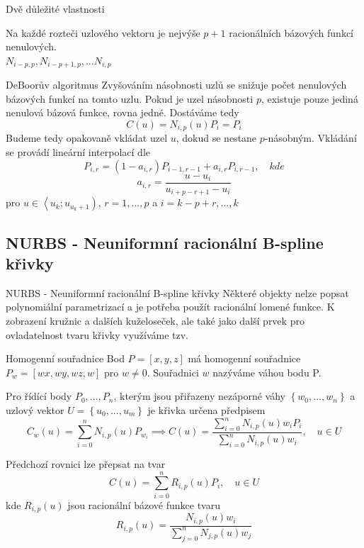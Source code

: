 \documentclass[hyperref={unicode}]{beamer}
\begin{document}
\begin{frame}{Dvě důležité vlastnosti}
\begin{minipage}{0.4\textwidth}
\end{minipage}
\begin{minipage}{0.55\textwidth}\raggedright
Na každé rozteči uzlového vektoru je nejvýše $p+1$ racionálních bázových funkcí nenulových.\\
$N_{i-p,p},N_{i-p+1,p},...N_{i,p}$
\end{minipage}
\end{frame}

\begin{frame}{DeBoorův algoritmus}
Zvyšováním násobnosti uzlů se snižuje počet nenulových bázových funkcí na tomto uzlu. Pokud je uzel násobnosti $p$, existuje pouze jediná nenulová bázová funkce, rovna jedné. Dostáváme tedy
$$C\left(u\right)=N_{i,p}\left(u\right)P_i=P_i$$
Budeme tedy opakovaně vkládat uzel $u$, dokud se nestane $p$-násobným. Vkládání se provádí lineární interpolací dle
$$P_{i,r}=\left(1-a_{i,r}\right)P_{i-1,r-1}+a_{i,r}P_{i,r-1},\quad kde$$
$$a_{i,r}=\frac{u-u_i}{u_{i+p-r+1}-u_i}$$
pro $u\in \left\langle u_k;u_{u_k+1}\right)$, $r=1,...,p$ a $i=k-p+r,...,k$
\end{frame}

\subsection{NURBS - Neuniformní racionální B-spline křivky}
\begin{frame}{NURBS - Neuniformní racionální B-spline křivky}
Některé objekty nelze popsat polynomiální parametrizací a je potřeba použít racionální lomené funkce. K zobrazení kružnic a dalších kuželoseček, ale také jako další prvek pro ovladatelnost tvaru křivky využíváme tzv.
\begin{block}{Homogenní souřadnice}
Bod $P=\left[x,y,z\right]$ má homogenní souřadnice $P_w=\left[wx,wy,wz,w\right]$ pro $w\neq0$. Souřadnici $w$ nazýváme váhou bodu P.
\end{block}
Pro řídící body $P_0,...,P_n$, kterým jsou přiřazeny nezáporné váhy $\left\lbrace w_0,...,w_n \right\rbrace$ a uzlový vektor $U=\left\lbrace u_0,...,u_m \right\rbrace$ je křivka určena předpisem
$$C_w\left(u\right)=\sum _{i=0}^{n}{N}_{i,p}\left(u\right){P}_{w_i} \implies C\left(u\right)=\frac{\sum _{i=0}^{n}{N}_{i,p}\left(u\right)w_i{P}_{i}}{\sum _{i=0}^{n}{N}_{i,p}\left(u\right)w_i},\quad u\in U$$
\end{frame}

\begin{frame}
Předchozí rovnici lze přepsat na tvar
$$C\left(u\right)=\sum _{i=0}^{n}{R}_{i,p}\left(u\right){P}_{i},\quad u\in U$$
kde ${R}_{i,p}\left( u \right)$ jsou racionální bázové funkce tvaru
$${R}_{i,p}\left(u\right)=\frac{{N}_{i,p}\left(u\right)w_i}{\sum _{j=0}^{n}{N}_{j,p}\left(u\right)w_j}$$
\end{frame}
\end{document}
